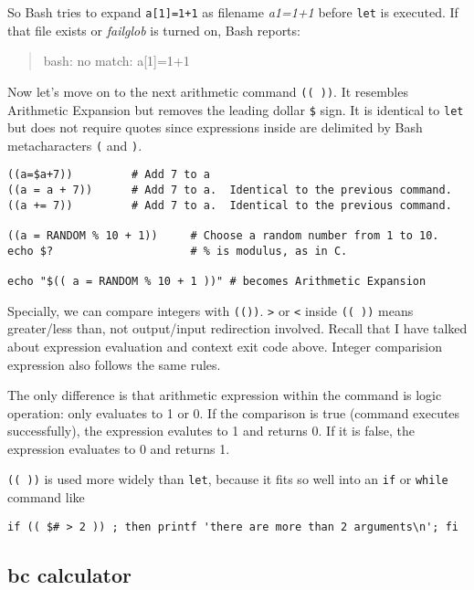 So Bash tries to expand \lstinline|a[1]=1+1| as filename
\textit{a1=1+1} before \lstinline|let| is executed. If that file
exists or \textit{failglob} is turned on, Bash reports:

\begin{quotation}
  bash: no match: a[1]=1+1
\end{quotation}

Now let's move on to the next arithmetic command
\lstinline|(( ))|. It resembles Arithmetic Expansion but removes
the leading dollar
\lstinline|$| sign. It is identical to \lstinline|let| but does
not require quotes since expressions inside are delimited by
Bash metacharacters \lstinline|(| and \lstinline|)|.

\begin{lstlisting}
((a=$a+7))         # Add 7 to a
((a = a + 7))      # Add 7 to a.  Identical to the previous command.
((a += 7))         # Add 7 to a.  Identical to the previous command.

((a = RANDOM % 10 + 1))     # Choose a random number from 1 to 10.
echo $?                     # % is modulus, as in C.

echo "$(( a = RANDOM % 10 + 1 ))" # becomes Arithmetic Expansion
\end{lstlisting}

Specially, we can compare integers with
\lstinline|(())|. \lstinline|>| or \lstinline|<| inside
\lstinline|(( ))| means greater/less than, not output/input
redirection involved. Recall that I have talked about expression
evaluation and context exit code above. Integer comparision
expression also follows the same rules.

The only difference is that arithmetic expression within the
command is logic operation: only evaluates to 1 or 0. If the
comparison is true (command executes successfully), the expression
evalutes to 1 and returns 0. If it is false, the expression
evaluates to 0 and returns 1.

\lstinline|(( ))| is used more widely than \lstinline|let|,
because it fits so well into an \lstinline|if| or
\lstinline|while| command like

\begin{lstlisting}
if (( $# > 2 )) ; then printf 'there are more than 2 arguments\n'; fi
\end{lstlisting}

\subsection{bc calculator}
\label{sec:bc-calculator}

